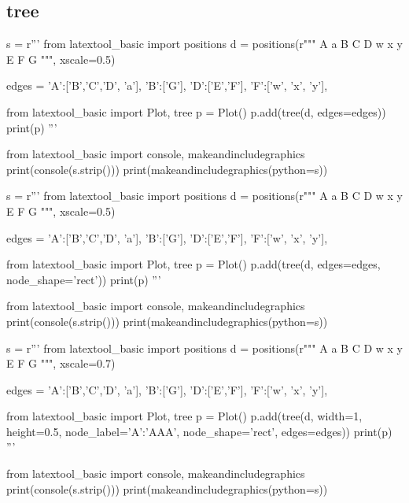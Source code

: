 \subsection{tree}

\begin{python}
s = r'''
from latextool_basic import positions
d = positions(r"""
  A   a 
B C D    w x y
    E F  
G
""", xscale=0.5)

edges = {'A':['B','C','D', 'a'],
         'B':['G'],
         'D':['E','F'],
         'F':['w', 'x', 'y'],
}

from latextool_basic import Plot, tree
p = Plot()
p.add(tree(d, edges=edges))
print(p)
'''

from latextool_basic import console, makeandincludegraphics
print(console(s.strip()))
print(makeandincludegraphics(python=s))
\end{python}




\begin{python}
s = r'''
from latextool_basic import positions
d = positions(r"""
  A   a 
B C D    w x y
    E F  
G
""", xscale=0.5)

edges = {'A':['B','C','D', 'a'],
         'B':['G'],
         'D':['E','F'],
         'F':['w', 'x', 'y'],
}

from latextool_basic import Plot, tree
p = Plot()
p.add(tree(d, edges=edges, node_shape='rect'))
print(p)
'''

from latextool_basic import console, makeandincludegraphics
print(console(s.strip()))
print(makeandincludegraphics(python=s))
\end{python}




\begin{python}
s = r'''
from latextool_basic import positions
d = positions(r"""
  A   a 
B C D    w x y
    E F  
G
""", xscale=0.7)

edges = {'A':['B','C','D', 'a'],
         'B':['G'],
         'D':['E','F'],
         'F':['w', 'x', 'y'],
}

from latextool_basic import Plot, tree
p = Plot()
p.add(tree(d,
           width=1, height=0.5, 
           node_label={'A':'AAA'},
           node_shape='rect',
           edges=edges))
print(p)
'''

from latextool_basic import console, makeandincludegraphics
print(console(s.strip()))
print(makeandincludegraphics(python=s))
\end{python}







